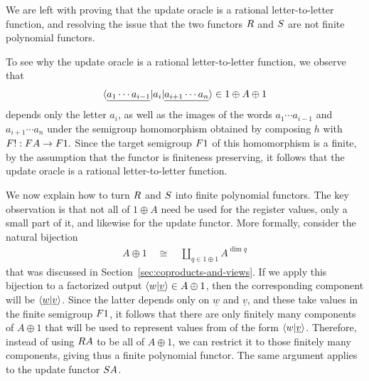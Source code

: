 We are left with proving that the update oracle is a rational letter-to-letter function, and resolving the issue that  the two functors $\functorr$ and $\functors$ are not finite polynomial functors.

To see why the update oracle is a rational letter-to-letter function, we observe that 
\begin{align*}
    \langle \underline{a_1 \cdots a_{i-1}}|a_i| \underline{a_{i+1} \cdots a_n} \rangle \in 1 \oplus A \oplus 1
    \end{align*}
depends only the letter $a_i$, as well as the images of the words  $a_1 \cdots a_{i-1}$ and $a_{i+1} \cdots a_n$ under the semigroup homomorphism obtained by composing $h$ with 
$
\functor ! : \functor A \to \functor 1.
$
Since the target semigroup $\functor 1$  of this homomorphism is a finite, by the assumption that the functor is finiteness preserving, it follows that the  update oracle is a rational letter-to-letter function.

We now explain how to turn $\functorr$ and $\functors$ into finite polynomial functors. The key observation is  that not all of $1 \oplus A$ need be used for the register values, only a small part of it, and likewise for the update functor. More formally, 
consider the natural bijection
\begin{align*}
A \oplus 1  \quad \cong \quad 
\coprod_{q \in 1 \oplus 1}  A^{\dim q}
\end{align*}
that was discussed in Section~\ref{sec:coproducts-and-views}. If we apply this bijection to a factorized output $
\langle w|\underline {v} \rangle \in A \oplus 1$, 
then the corresponding component will be $\langle \underline w | \underline v \rangle$. Since the latter depends only  on $\underline w$ and $\underline v$, and these take values in the finite semigroup $\functor 1$, it follows that there are only finitely many components of $A \oplus 1$ that will be used to represent values from of the form $\langle w | \underline v \rangle$. Therefore, instead of using $\functorr A$ to be all of $A \oplus 1$, we can restrict it to those finitely many components, giving thus a finite polynomial functor. The same argument applies to the update functor $\functors A$.